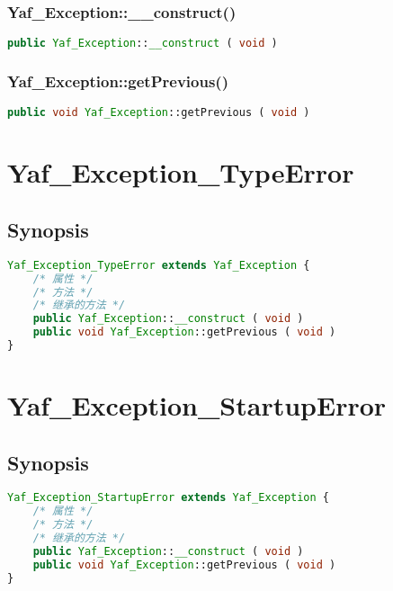 \subsection{Yaf\_Exception::\_\_construct()}





\begin{lstlisting}[language=PHP]
public Yaf_Exception::__construct ( void )
\end{lstlisting}



\subsection{Yaf\_Exception::getPrevious()}


\begin{lstlisting}[language=PHP]
public void Yaf_Exception::getPrevious ( void )
\end{lstlisting}

\chapter{Yaf\_Exception\_TypeError}


\section{Synopsis}


\begin{lstlisting}[language=PHP]
Yaf_Exception_TypeError extends Yaf_Exception {
    /* 属性 */
    /* 方法 */
    /* 继承的方法 */
    public Yaf_Exception::__construct ( void )
    public void Yaf_Exception::getPrevious ( void )
}
\end{lstlisting}


\chapter{Yaf\_Exception\_StartupError}


\section{Synopsis}


\begin{lstlisting}[language=PHP]
Yaf_Exception_StartupError extends Yaf_Exception {
    /* 属性 */
    /* 方法 */
    /* 继承的方法 */
    public Yaf_Exception::__construct ( void )
    public void Yaf_Exception::getPrevious ( void )
}
\end{lstlisting}


